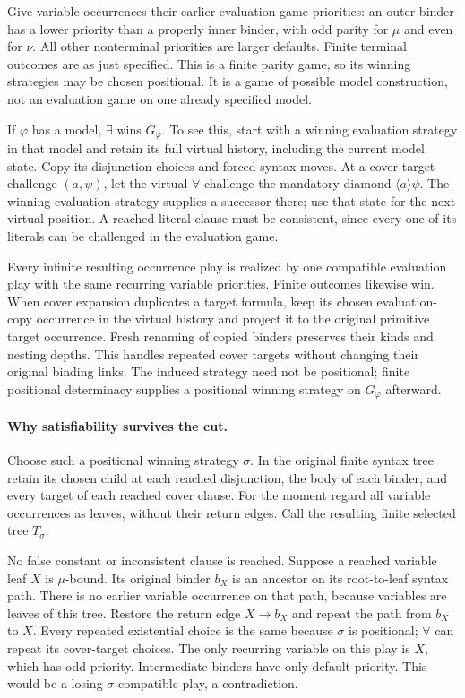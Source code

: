 Give variable occurrences their
earlier evaluation-game priorities:
an outer binder has a lower
priority than a properly inner
binder, with odd parity for
\(\mu\) and even for \(\nu\).
All other nonterminal priorities
are larger defaults.
Finite terminal outcomes are
as just specified.
This is a finite parity game,
so its winning strategies
may be chosen positional.
It is a game of possible
model construction, not an
evaluation game on one
already specified model.

If \(\varphi\) has a model,
\(\exists\) wins \(G_\varphi\).
To see this, start with a
winning evaluation strategy
in that model and retain
its full virtual history,
including the current model
state. Copy its disjunction
choices and forced syntax
moves. At a cover-target
challenge \((a,\psi)\),
let the virtual \(\forall\)
challenge the mandatory
diamond \(\langle a\rangle\psi\).
The winning evaluation strategy
supplies a successor there;
use that state for the
next virtual position.
A reached literal clause
must be consistent, since
every one of its literals
can be challenged in the
evaluation game.

Every infinite resulting
occurrence play is realized
by one compatible evaluation
play with the same recurring
variable priorities. Finite
outcomes likewise win.
When cover expansion duplicates
a target formula, keep its
chosen evaluation-copy occurrence
in the virtual history and
project it to the original
primitive target occurrence.
Fresh renaming of copied
binders preserves their kinds
and nesting depths.
This handles repeated cover
targets without changing their
original binding links.
The induced strategy need
not be positional; finite
positional determinacy supplies
a positional winning strategy
on \(G_\varphi\) afterward.

\paragraph{Why satisfiability survives the cut.}
Choose such a positional
winning strategy \(\sigma\).
In the original finite syntax
tree retain its chosen child
at each reached disjunction,
the body of each binder,
and every target of each
reached cover clause.
For the moment regard all
variable occurrences as leaves,
without their return edges.
Call the resulting finite
selected tree \(T_\sigma\).

No false constant or
inconsistent clause is reached.
Suppose a reached variable
leaf \(X\) is \(\mu\)-bound.
Its original binder \(b_X\)
is an ancestor on its
root-to-leaf syntax path.
There is no earlier variable
occurrence on that path,
because variables are leaves
of this tree.
Restore the return edge
\(X\to b_X\) and repeat
the path from \(b_X\)
to \(X\).
Every repeated existential
choice is the same because
\(\sigma\) is positional;
\(\forall\) can repeat its
cover-target choices.
The only recurring variable
on this play is \(X\),
which has odd priority.
Intermediate binders have
only default priority.
This would be a losing
\(\sigma\)-compatible play,
a contradiction.

